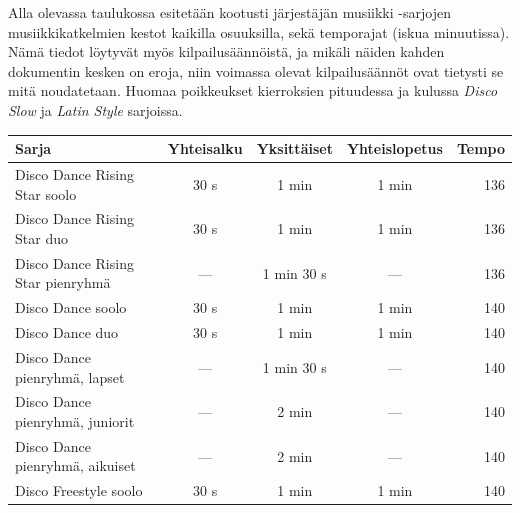 \documentclass[12pt, a4paper, oneside]{article}
\begin{document}
Alla olevassa taulukossa esitetään kootusti järjestäjän musiikki -sarjojen musiikkikatkelmien kestot kaikilla osuuksilla, sekä temporajat (iskua minuutissa). Nämä tiedot löytyvät myös kilpailusäännöistä, ja mikäli näiden kahden dokumentin kesken on eroja, niin voimassa olevat kilpailusäännöt ovat tietysti se mitä noudatetaan. Huomaa poikkeukset kierroksien pituudessa ja kulussa \textit{Disco Slow} ja \textit{Latin Style} sarjoissa.
\begin{table}[h!]
    \centering
    \setlength\tabcolsep{8pt}
    \small
    \renewcommand{\arraystretch}{1.8}
    \begin{tabular}{@{\hspace{0.25cm}}lcccr@{\hspace{0.25cm}}}
        \toprule
        \textbf{Sarja}                                      & \textbf{Yhteisalku} & \textbf{Yksittäiset} & \textbf{Yhteislopetus} & \textbf{Tempo} \\ \midrule
        Disco Dance Rising Star soolo                       & 30 s                & 1 min                & 1 min                  & 136            \\
        Disco Dance Rising Star duo                         & 30 s                & 1 min                & 1 min                  & 136            \\
        Disco Dance Rising Star pienryhmä                   & ---                 & 1 min 30 s           & ---                    & 136            \\
        Disco Dance soolo                                   & 30 s                & 1 min                & 1 min                  & 140            \\
        Disco Dance duo                                     & 30 s                & 1 min                & 1 min                  & 140            \\
        Disco Dance pienryhmä, lapset                       & ---                 & 1 min 30 s           & ---                    & 140            \\
        Disco Dance pienryhmä, juniorit                     & ---                 & 2 min                & ---                    & 140            \\
        Disco Dance pienryhmä, aikuiset                     & ---                 & 2 min                & ---                    & 140            \\
        Disco Freestyle soolo                               & 30 s                & 1 min                & 1 min                  & 140            \\

\end{tabular}
\end{table}
\end{document}
